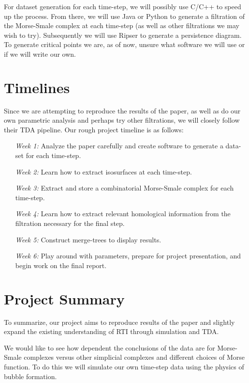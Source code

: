 \documentclass[12pt, fullpage,letterpaper]{article}
\begin{document}
	For dataset generation for each time-step, we will possibly use C/C++ to speed up the process. From there, we will use Java or Python to generate a filtration of the Morse-Smale complex at each time-step (as well as other filtrations we may wish to try). Subsequently we will use Ripser to generate a persistence diagram. To generate critical points we are, as of now, unsure what software we will use or if we will write our own.
	
	\section*{\normalfont Timelines}  

	Since we are attempting to reproduce the results of the paper, as well as do our own parametric analysis and perhaps try other filtrations, we will closely follow their TDA pipeline. Our rough project timeline is as follows:
	\begin{enumerate}
		\item[{\textit{Week 1:}}] 
		Analyze the paper carefully and create software to generate a data-set for each time-step.
		\item[{\textit{Week 2:}}] 
		Learn how to extract isosurfaces at each time-step.
		\item[{\textit{Week 3:}}] 
		Extract and store a combinatorial Morse-Smale complex for each time-step.
		\item[{\textit{Week 4:}}] 
		Learn how to extract relevant homological information from the filtration necessary for the final step.
		\item[{\textit{Week 5:}}]  
		Construct merge-trees to display results.
		\item[{\textit{Week 6:}}] 
		Play around with parameters, prepare for project presentation, and begin work on the final report. 
	\end{enumerate}  

	\section*{\normalfont Project Summary}  
%		
%		
%		
%		
%		
	To summarize, our project aims to reproduce results of the paper and slightly expand the existing understanding of RTI through simulation and TDA. 
	
	We would like to see how dependent the conclusions of the data are for Morse-Smale complexes versus other simplicial complexes and different choices of Morse function. To do this we will simulate our own time-step data using the physics of bubble formation. 
\end{document}
